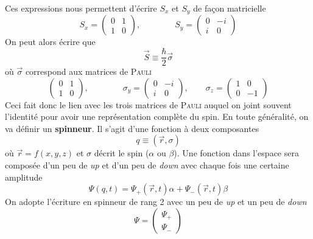 Ces expressions nous permettent d'écrire $S_x$ et $S_y$ de façon matricielle
\begin{equation}
S_x = \left(\begin{array}{cc}
0&1\\
1&0
\end{array}\right),\qquad\qquad
S_y = \left(\begin{array}{cc}
0&-i\\
i&0
\end{array}\right)
\end{equation}
On peut alors écrire que
\begin{equation}
\vec{S} \equiv \frac{\hbar}{2}\vec{\sigma}
\end{equation}
où $\vec\sigma$ correspond aux matrices de \textsc{Pauli}
\begin{equation}
\left(\begin{array}{cc}
0&1\\
1&0
\end{array}\right),\qquad\qquad
\sigma_y = \left(\begin{array}{cc}
0&-i\\
i&0
\end{array}\right),\qquad
\sigma_z = \left(\begin{array}{cc}
1&0\\
0&-1
\end{array}\right)
\end{equation}
Ceci fait donc le lien avec les trois matrices de \textsc{Pauli} auquel on joint souvent l'identité pour 
avoir une représentation complète du spin. En toute généralité, on va définir un \textbf{spinneur}. Il 
s'agit d'une fonction à deux composantes
\begin{equation}
q\equiv (\vec{r},\sigma)
\end{equation}
où $\vec{r} = f(x,y,z)$ et $\sigma$ décrit le spin ($\alpha$ ou $\beta$). Une fonction dans l'espace sera 
composée d'un peu de \textit{up} et d'un peu de \textit{down} avec chaque fois une certaine amplitude
\begin{equation}
\Psi(q,t) = \Psi_+(\vec{r},t)\alpha + \Psi_-(\vec{r},t)\beta
\end{equation}
On adopte l'écriture en spinneur de rang 2 avec un peu de \textit{up} et un peu de \textit{down}
\begin{equation}
\Psi = \left(\begin{array}{c}
\Psi_+\\
\Psi_-
\end{array}\right)
\end{equation}


